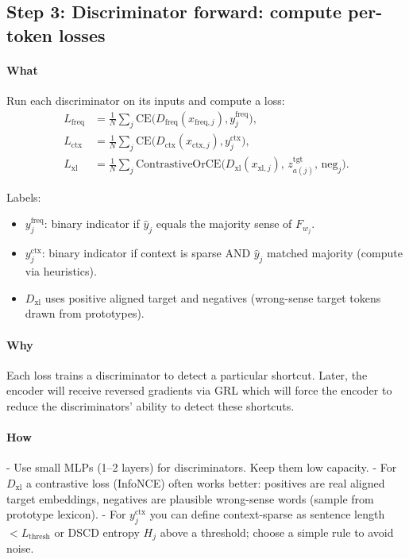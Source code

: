 \documentclass[11pt]{article}
\begin{document}
\subsection*{Step 3: Discriminator forward: compute per-token losses}
\paragraph{What}
Run each discriminator on its inputs and compute a loss:
\[
\begin{aligned}
L_{\text{freq}} &= \frac{1}{N}\sum_j \mathrm{CE}\big(D_{\text{freq}}(x_{\text{freq},j}), y^{\text{freq}}_j\big),\\
L_{\text{ctx}}  &= \frac{1}{N}\sum_j \mathrm{CE}\big(D_{\text{ctx}}(x_{\text{ctx},j}), y^{\text{ctx}}_j\big),\\
L_{\text{xl}}   &= \frac{1}{N}\sum_j \mathrm{ContrastiveOrCE}\big(D_{\text{xl}}(x_{\text{xl},j}),\, z^{\mathrm{tgt}}_{a(j)},\, \text{neg}_j\big).
\end{aligned}
\]

Labels:
\begin{itemize}
  \item $y^{\text{freq}}_j$: binary indicator if $\hat{y}_j$ equals the majority sense of $F_{w_j}$.
  \item $y^{\text{ctx}}_j$: binary indicator if context is sparse AND $\hat{y}_j$ matched majority (compute via heuristics).
  \item $D_{\text{xl}}$ uses positive aligned target and negatives (wrong-sense target tokens drawn from prototypes).
\end{itemize}

\paragraph{Why}
Each loss trains a discriminator to detect a particular shortcut. Later, the encoder will receive reversed gradients via GRL which will force the encoder to reduce the discriminators' ability to detect these shortcuts.

\paragraph{How}
- Use small MLPs (1--2 layers) for discriminators. Keep them low capacity.  
- For $D_{\text{xl}}$ a contrastive loss (InfoNCE) often works better: positives are real aligned target embeddings, negatives are plausible wrong-sense words (sample from prototype lexicon).  
- For $y^{\text{ctx}}_j$ you can define context-sparse as sentence length $< L_{\text{thresh}}$ or DSCD entropy $H_j$ above a threshold; choose a simple rule to avoid noise.
\end{document}
